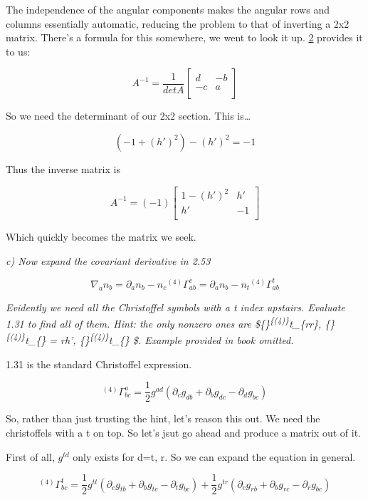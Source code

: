 \documentclass[landscape,letterpaper,10pt,english]{article}
\begin{document}
    The independence of the angular components makes the angular rows and
columns essentially automatic, reducing the problem to that of inverting
a 2x2 matrix. There's a formula for this somewhere, we went to look it
up. \hyperref[2]{2} provides it to us:

\[A^{-1} = \frac{1}{detA} \begin{bmatrix}
d & -b \\
-c & a \\
\end{bmatrix}\]

So we need the determinant of our 2x2 section. This is\ldots{}

\[ (-1 + (h')^2) - (h')^2 = -1 \]

Thus the inverse matrix is

\[A^{-1} = (-1) \begin{bmatrix}
1-(h')^2 & h' \\
h' & -1 \\
\end{bmatrix}\]

Which quickly becomes the matrix we seek.

    \emph{c) Now expand the covariant derivative in 2.53}

\[\nabla_a n_b = \partial_a n_b - n_c {}^{(4)}\Gamma^c_{ab} = \partial_a n_b - n_t {}^{(4)} \Gamma^t_{ab}\]

\emph{Evidently we need all the Christoffel symbols with a t index
upstairs. Evaluate 1.31 to find all of them. Hint: the only nonzero ones
are \$\{\}\textsuperscript{\{(4)\}\Gamma}t\_\{rr\},
\{\}\textsuperscript{\{(4)\}\Gamma}t\_\{\theta\theta\} = rh',
\{\}\textsuperscript{\{(4)\}\Gamma}t\_\{\phi\phi\} \$. Example provided
in book omitted.}

    1.31 is the standard Christoffel expression.

\[ {}^{(4)}\Gamma^a_{bc} = \frac12 g^{ad}(\partial_c g_{db} + \partial_b g_{dc} - \partial_d g_{bc}) \]

    So, rather than just trusting the hint, let's reason this out. We need
the christoffels with a t on top. So let's jsut go ahead and produce a
matrix out of it.

First of all, \(g^{td}\) only exists for d=t, r. So we can expand the
equation in general.

\[ {}^{(4)}\Gamma^t_{bc} = \frac12 g^{tt}(\partial_c g_{tb} + \partial_b g_{tc} - \partial_t g_{bc}) + \frac12 g^{tr}(\partial_c g_{rb} + \partial_b g_{rc} - \partial_r g_{bc}) \]
\end{document}
